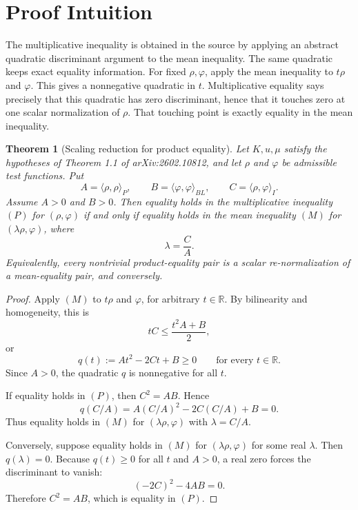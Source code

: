 \documentclass[11pt]{article}
\newtheorem{theorem}{Theorem}
\begin{document}
\section*{Proof Intuition}

The multiplicative inequality is obtained in the source by applying an
abstract quadratic discriminant argument to the mean inequality.  The same
quadratic keeps exact equality information.  For fixed \(\rho,\varphi\), apply
the mean inequality to \(t\rho\) and \(\varphi\).  This gives a nonnegative
quadratic in \(t\).  Multiplicative equality says precisely that this
quadratic has zero discriminant, hence that it touches zero at one scalar
normalization of \(\rho\).  That touching point is exactly equality in the
mean inequality.

\begin{theorem}[Scaling reduction for product equality]
Let \(K,u,\mu\) satisfy the hypotheses of Theorem 1.1 of arXiv:2602.10812, and
let \(\rho\) and \(\varphi\) be admissible test functions.  Put
\[
A=\langle\rho,\rho\rangle_P,\qquad
B=\langle\varphi,\varphi\rangle_{BL},\qquad
C=\langle\rho,\varphi\rangle_I .
\]
Assume \(A>0\) and \(B>0\).  Then equality holds in the multiplicative
inequality \((P)\) for \((\rho,\varphi)\) if and only if equality holds in the
mean inequality \((M)\) for \((\lambda\rho,\varphi)\), where
\[
  \lambda=\frac{C}{A}.
\]
Equivalently, every nontrivial product-equality pair is a scalar
re-normalization of a mean-equality pair, and conversely.
\end{theorem}

\begin{proof}
Apply \((M)\) to \(t\rho\) and \(\varphi\), for arbitrary \(t\in\mathbb R\).
By bilinearity and homogeneity, this is
\[
  tC\le \frac{t^2A+B}{2},
\]
or
\[
  q(t):=At^2-2Ct+B\ge 0
  \qquad\text{for every }t\in\mathbb R.
\]
Since \(A>0\), the quadratic \(q\) is nonnegative for all \(t\).

If equality holds in \((P)\), then \(C^2=AB\).  Hence
\[
  q(C/A)=A(C/A)^2-2C(C/A)+B=0.
\]
Thus equality holds in \((M)\) for \((\lambda\rho,\varphi)\) with
\(\lambda=C/A\).

Conversely, suppose equality holds in \((M)\) for \((\lambda\rho,\varphi)\)
for some real \(\lambda\).  Then \(q(\lambda)=0\).  Because \(q(t)\ge0\) for
all \(t\) and \(A>0\), a real zero forces the discriminant to vanish:
\[
  (-2C)^2-4AB=0.
\]
Therefore \(C^2=AB\), which is equality in \((P)\).
\end{proof}
\end{document}

